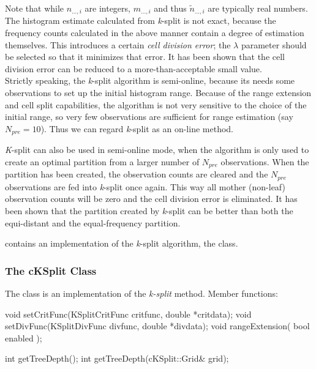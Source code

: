 
Note that while $n_{...,i}$ are integers, $m_{...,i}$ and thus
$\tilde{n}_{...,i}$ are typically real numbers. The histogram estimate
calculated from \textit{k}-split is not exact, because the frequency
counts calculated in the above manner contain a degree of estimation
themselves. This introduces a certain \textit{cell division error};
the $\lambda$ parameter should be selected so that it minimizes that
error. It has been shown that the cell division error can
be reduced to a more-than-acceptable small value.\\
Strictly speaking, the \textit{k}-split algorithm is semi-online,
because its needs some observations to set up the initial histogram
range.  Because of the range extension and cell split
capabilities, the algorithm is not very sensitive to the choice of the
initial range, so very few observations are sufficient for range
estimation (say $N_{pre}=10$). Thus we can regard \textit{k}-split as
an on-line method.

\textit{K}-split can also be used in semi-online mode, when the
algorithm is only used to create an optimal partition from a larger
number of $N_{pre}$ observations. When the partition has been created,
the observation counts are cleared and the $N_{pre}$ observations are
fed into \textit{k}-split once again. This way all mother (non-leaf)
observation counts will be zero and the cell division error is
eliminated. It has been shown that the partition created by
\textit{k}-split can be better than both the equi-distant and the
equal-frequency partition.


{\opp} contains an implementation of the \textit{k}-split algorithm,
the  class.

\subsubsection{The cKSplit Class}

The  class is an implementation of the \textit{k-split} method.
Member functions:

%
%

\begin{cpp}
void setCritFunc(KSplitCritFunc critfunc, double *critdata);
void setDivFunc(KSplitDivFunc divfunc, double *divdata);
void rangeExtension( bool enabled );
\end{cpp}


\begin{cpp}
int getTreeDepth();
int getTreeDepth(cKSplit::Grid& grid);
\end{cpp}

